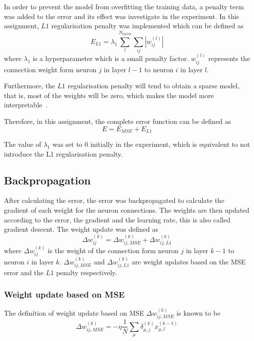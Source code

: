 \documentclass[conference]{IEEEtran}
\begin{document}
In order to prevent the model from overfitting the training data, a penalty term was added to the error and its effect was investigate in the experiment. In this assignment, \(L1\) regularisation penalty was implemented which can be defined as
\begin{equation}
    E_{L1} = \lambda_1\sum_l^{N_{\text{layers}}}\sum_{ij}\left|w_{ij}^{(l)}\right|
\end{equation}
where \({\lambda_1}\) is a hyperparameter which is a small penalty factor. \(w_{ij}^{(l)}\) represents the connection weight form neuron \(j\) in layer \(l-1\) to neuron \(i\) in layer \(l\).

Furthermore, the \(L1\) regularisation penalty will tend to obtain a sparse model, that is, most of the weights will be zero, which makes the model more interpretable~\cite{schmidt2005least}.

Therefore, in this assignment, the complete error function can be defined as
\begin{equation}
    E = E_{MSE} + E_{L1}
\end{equation}

The value of \({\lambda_1}\) was set to 0 initially in the experiment, which is equivalent to not introduce the L1 regularisation penalty.

\subsection{Backpropagation}

After calculating the error, the error was backpropagated to calculate the gradient of each weight for the neuron connections. The weights are then updated according to the error, the gradient and the learning rate, this is also called gradient descent. The weight update was defined as
\begin{equation}
    \Delta w_{ij}^{(k)} = \Delta w_{ij,MSE}^{(k)}+\Delta w_{ij,L1}^{(k)}
\end{equation}
where \(\Delta w_{ij}^{(k)}\) is the weight of the connection form neuron \(j\) in layer \(k-1\) to neuron \(i\) in layer \(k\). \(\Delta w_{ij,MSE}^{(k)}\) and \(\Delta w_{ij,L1}^{(k)}\) are weight updates based on the MSE error and the \(L1\) penalty respectively.

\subsubsection{Weight update based on MSE}

The definition of weight update based on MSE \(\Delta w_{ij,MSE}^{(k)}\) is known to be
\begin{equation}
    \Delta w_{ij,MSE}^{(k)} = -\eta\frac{1}{N}\sum_\mu\delta^{(k)}_{\mu,j}x^{(k-1)}_{\mu,l}
\end{equation}
\end{document}
